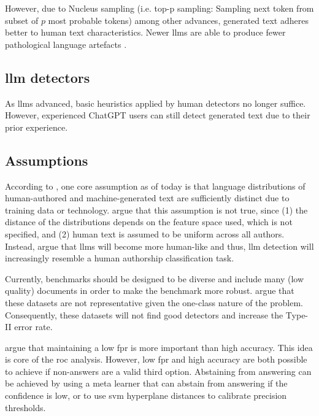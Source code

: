 However, due to Nucleus sampling (i.e. top-p sampling: Sampling next token from subset of $p$ most probable tokens) 
among other advances, generated text adheres better to human text characteristics.
Newer \acp{llm} are able to produce fewer pathological language artefacts \cite{llm_detection_av_2025}.

\subsection{\ac{llm} detectors}

As \acp{llm} advanced, basic heuristics applied by human detectors no longer suffice.
However, experienced ChatGPT users can still detect generated text due to their prior experience.

\subsection{Assumptions}

According to \citet{llm_detection_av_2025}, one core assumption as of today is that 
language distributions of human-authored and machine-generated text are sufficiently distinct due to training data or technology.
\citet{llm_detection_av_2025} argue that this assumption is not true, since 
(1) the distance of the distributions depends on the feature space used, which is not specified, and
(2) human text is assumed to be uniform across all authors.
Instead, \citet{llm_detection_av_2025} argue that \acp{llm} will become more human-like and thus, 
\ac{llm} detection will increasingly resemble a human authorship classification task.

Currently, benchmarks should be designed to be diverse and include many (low quality) documents in order to make the benchmark more robust.
\citet{llm_detection_av_2025} argue that these datasets are not representative given the one-class nature of the problem.
Consequently, these datasets will not find good detectors and increase the Type-II error rate.

\citet{llm_detection_av_2025} argue that maintaining a low \ac{fpr} is more important than high accuracy.
This idea is core of the \ac{roc} analysis.
However, low \ac{fpr} and high accuracy are both possible to achieve if non-answers are a valid third option.
Abstaining from answering can be achieved by using a meta learner that can abstain from answering if the confidence is low, 
or to use \ac{svm} hyperplane distances to calibrate precision thresholds.


